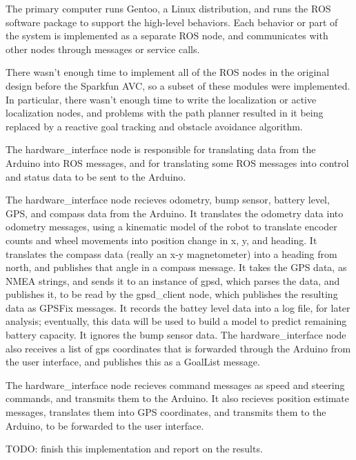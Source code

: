 
The primary computer runs Gentoo, a Linux distribution, and runs the ROS software package to support the high-level behaviors. Each behavior or part of the system is implemented as a separate ROS node, and communicates with other nodes through messages or service calls.

There wasn't enough time to implement all of the ROS nodes in the original design before the Sparkfun AVC, so a subset of these modules were implemented. In particular, there wasn't enough time to write the localization or active localization nodes, and problems with the path planner resulted in it being replaced by a reactive goal tracking and obstacle avoidance algorithm.

The hardware\_interface node is responsible for translating data from the Arduino into ROS messages, and for translating some ROS messages into control and status data to be sent to the Arduino. 

The hardware\_interface node recieves odometry, bump sensor, battery level, GPS, and compass data from the Arduino. It translates the odometry data into odometry messages, using a kinematic model of the robot to translate encoder counts and wheel movements into position change in x, y, and heading. It translates the compass data (really an x-y magnetometer) into a heading from north, and publishes that angle in a compass message. It takes the GPS data, as NMEA strings, and sends it to an instance of gpsd\cite{gpsd}, which parses the data, and publishes it, to be read by the gpsd\_client node, which publishes the resulting data as GPSFix messages. It records the battey level data into a log file, for later analysis; eventually, this data will be used to build a model to predict remaining battery capacity. It ignores the bump sensor data. The hardware\_interface node also receives a list of gps coordinates that is forwarded through the Arduino from the user interface, and publishes this as a GoalList message.

The hardware\_interface node recieves command messages as speed and steering commands, and transmits them to the Arduino. It also recieves position estimate messages, translates them into GPS coordinates, and transmits them to the Arduino, to be forwarded to the user interface.

TODO: finish this implementation and report on the results.


